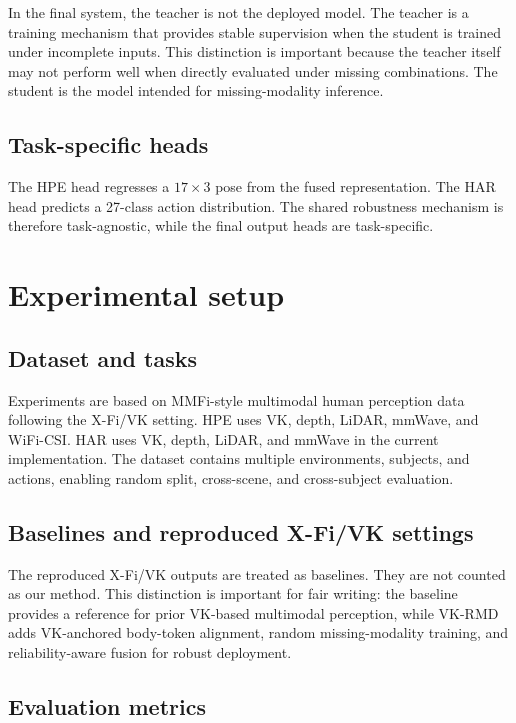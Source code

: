 \documentclass[preprint,12pt]{elsarticle}
\newcommand{\method}{VK-RMD}
\begin{document}
In the final system, the teacher is not the deployed model. The teacher is a training mechanism that provides stable supervision when the student is trained under incomplete inputs. This distinction is important because the teacher itself may not perform well when directly evaluated under missing combinations. The student is the model intended for missing-modality inference.

\subsection{Task-specific heads}

The HPE head regresses a $17\times3$ pose from the fused representation. The HAR head predicts a 27-class action distribution. The shared robustness mechanism is therefore task-agnostic, while the final output heads are task-specific.

\section{Experimental setup}

\subsection{Dataset and tasks}

Experiments are based on MMFi-style multimodal human perception data following the X-Fi/VK setting. HPE uses VK, depth, LiDAR, mmWave, and WiFi-CSI. HAR uses VK, depth, LiDAR, and mmWave in the current implementation. The dataset contains multiple environments, subjects, and actions, enabling random split, cross-scene, and cross-subject evaluation.

\subsection{Baselines and reproduced X-Fi/VK settings}

The reproduced X-Fi/VK outputs are treated as baselines. They are not counted as our method. This distinction is important for fair writing: the baseline provides a reference for prior VK-based multimodal perception, while \method{} adds VK-anchored body-token alignment, random missing-modality training, and reliability-aware fusion for robust deployment.

\subsection{Evaluation metrics}
\end{document}

